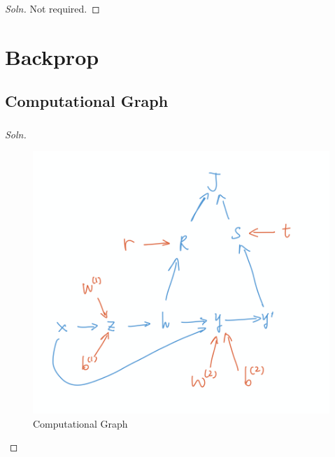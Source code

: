 \documentclass{article}
\begin{document}
	\subsubsection{}
	\begin{proof}[Soln]
		Not required.
	\end{proof}
	
	\section{Backprop}
	\subsection{Computational Graph}
	\subsubsection{}
	\begin{proof}[Soln]
		\begin{figure}[H]
			\center
			\includegraphics[width=\linewidth]{comp_graph.png}
			\caption{Computational Graph}
		\end{figure}
	\end{proof}
\end{document}
